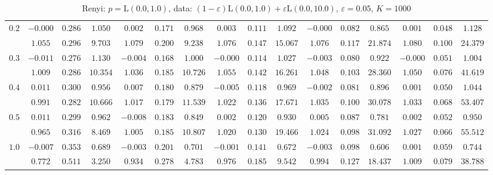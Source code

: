 \begin{table}[ht]
\begin{center}
\begin{tabular}{|c|ccc|ccc|ccc|ccc|ccc|}
\hline 
$0.2$ & $ -0.000 $ & $ 0.286 $ & $ 1.050 $ & $ 0.002 $ & $ 0.171 $ & $ 0.968 $ & $ 0.003 $ & $ 0.111 $ & $ 1.092 $ & $ -0.000 $ & $ 0.082 $ & $ 0.865 $ & $ 0.001 $ & $ 0.048 $ & $ 1.128 $\\ 
 & $ 1.055 $ & $ 0.296 $ & $ 9.703 $ & $ 1.079 $ & $ 0.200 $ & $ 9.238 $ & $ 1.076 $ & $ 0.147 $ & $ 15.067 $ & $ 1.076 $ & $ 0.117 $ & $ 21.874 $ & $ 1.080 $ & $ 0.100 $ & $ 24.379 $\\ 
\hline 
$0.3$ & $ -0.011 $ & $ 0.276 $ & $ 1.130 $ & $ -0.004 $ & $ 0.168 $ & $ 1.000 $ & $ -0.000 $ & $ 0.114 $ & $ 1.027 $ & $ -0.003 $ & $ 0.080 $ & $ 0.922 $ & $ -0.000 $ & $ 0.051 $ & $ 1.004 $\\ 
 & $ 1.009 $ & $ 0.286 $ & $ 10.354 $ & $ 1.036 $ & $ 0.185 $ & $ 10.726 $ & $ 1.055 $ & $ 0.142 $ & $ 16.261 $ & $ 1.048 $ & $ 0.103 $ & $ 28.360 $ & $ 1.050 $ & $ 0.076 $ & $ 41.619 $\\ 
\hline 
$0.4$ & $ 0.011 $ & $ 0.300 $ & $ 0.956 $ & $ 0.007 $ & $ 0.180 $ & $ 0.879 $ & $ -0.005 $ & $ 0.118 $ & $ 0.969 $ & $ -0.002 $ & $ 0.081 $ & $ 0.896 $ & $ 0.001 $ & $ 0.050 $ & $ 1.044 $\\ 
 & $ 0.991 $ & $ 0.282 $ & $ 10.666 $ & $ 1.017 $ & $ 0.179 $ & $ 11.539 $ & $ 1.022 $ & $ 0.136 $ & $ 17.671 $ & $ 1.035 $ & $ 0.100 $ & $ 30.078 $ & $ 1.033 $ & $ 0.068 $ & $ 53.407 $\\ 
\hline 
$0.5$ & $ 0.011 $ & $ 0.299 $ & $ 0.962 $ & $ -0.008 $ & $ 0.183 $ & $ 0.849 $ & $ 0.002 $ & $ 0.120 $ & $ 0.930 $ & $ 0.005 $ & $ 0.087 $ & $ 0.781 $ & $ 0.002 $ & $ 0.052 $ & $ 0.950 $\\ 
 & $ 0.965 $ & $ 0.316 $ & $ 8.469 $ & $ 1.005 $ & $ 0.185 $ & $ 10.807 $ & $ 1.020 $ & $ 0.130 $ & $ 19.466 $ & $ 1.024 $ & $ 0.098 $ & $ 31.092 $ & $ 1.027 $ & $ 0.066 $ & $ 55.512 $\\ 
\hline 
$1.0$ & $ -0.007 $ & $ 0.353 $ & $ 0.689 $ & $ -0.003 $ & $ 0.201 $ & $ 0.701 $ & $ -0.001 $ & $ 0.141 $ & $ 0.672 $ & $ -0.003 $ & $ 0.098 $ & $ 0.606 $ & $ 0.001 $ & $ 0.059 $ & $ 0.744 $\\ 
 & $ 0.772 $ & $ 0.511 $ & $ 3.250 $ & $ 0.934 $ & $ 0.278 $ & $ 4.783 $ & $ 0.976 $ & $ 0.185 $ & $ 9.542 $ & $ 0.994 $ & $ 0.127 $ & $ 18.437 $ & $ 1.009 $ & $ 0.079 $ & $ 38.788 $\\ 
\hline 
\end{tabular}
\caption{Renyi: $p = \mathrm{L}(0.0,1.0)$, data: $(1-\varepsilon)\mathrm{L}(0.0,1.0) + \varepsilon \mathrm{L}(0.0,10.0)$, $\varepsilon =  0.05$, $K = 1000$} 
\end{center}
\end{table}
